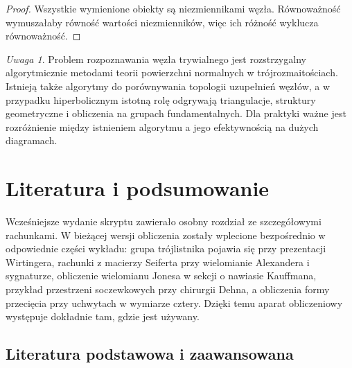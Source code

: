 \documentclass[11pt,a4paper]{report}
\numberwithin{equation}{section}
\theoremstyle{plain}
\theoremstyle{definition}
\theoremstyle{remark}
\newtheorem{uwaga}[twierdzenie]{Uwaga}
\begin{document}
\begin{proof}
Wszystkie wymienione obiekty są niezmiennikami węzła.
Równoważność wymuszałaby równość wartości niezmienników,
więc ich różność wyklucza równoważność.
\end{proof}

\begin{uwaga}
Problem rozpoznawania węzła trywialnego jest rozstrzygalny
algorytmicznie metodami teorii powierzchni normalnych
w trójrozmaitościach. Istnieją także algorytmy do porównywania
topologii uzupełnień węzłów, a w przypadku hiperbolicznym
istotną rolę odgrywają triangulacje, struktury geometryczne
i obliczenia na grupach fundamentalnych.
Dla praktyki ważne jest rozróżnienie między istnieniem
algorytmu a jego efektywnością na dużych diagramach.
\end{uwaga}



\chapter{Literatura i podsumowanie}
\label{ch:kt-literatura-podsumowanie}

Wcześniejsze wydanie skryptu zawierało osobny rozdział ze szczegółowymi rachunkami. W bieżącej wersji obliczenia zostały wplecione bezpośrednio w odpowiednie części wykładu: grupa trójlistnika pojawia się przy prezentacji Wirtingera, rachunki z macierzy Seiferta przy wielomianie Alexandera i sygnaturze, obliczenie wielomianu Jonesa w sekcji o nawiasie Kauffmana, przykład przestrzeni soczewkowych przy chirurgii Dehna, a obliczenia formy przecięcia przy uchwytach w wymiarze cztery. Dzięki temu aparat obliczeniowy występuje dokładnie tam, gdzie jest używany.

\section{Literatura podstawowa i zaawansowana}
\label{sec:kt-literatura}
\end{document}
